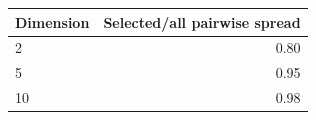 \begin{tabular}{lr}
\toprule
Dimension & Selected/all pairwise spread \\
\midrule
2 & 0.80 \\
5 & 0.95 \\
10 & 0.98 \\
\bottomrule
\end{tabular}
